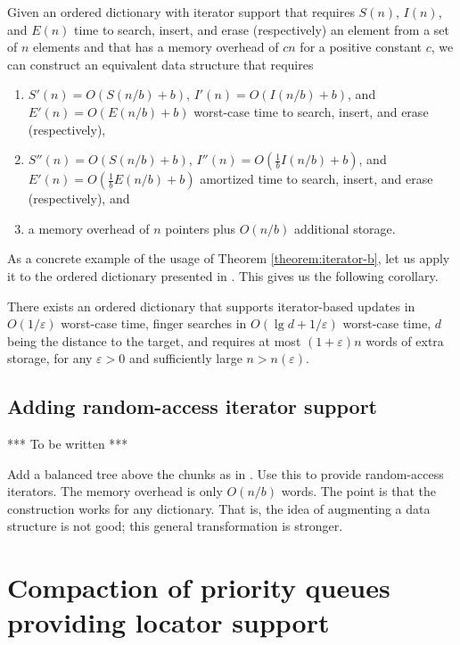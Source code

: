 \documentclass{DIKU-article}
\newcommand{\seclabel}[1]{\label{sec:#1}}
\begin{document}
\begin{theorem}
\label{theorem:iterator-b}
Given an ordered dictionary with iterator support that requires 
$S(n)$, $I(n)$, and $E(n)$
time to search, insert, and erase (respectively) an element from a
set of $n$ elements and that has a memory overhead of $cn$ for a
positive constant $c$, we can construct an equivalent data structure
that requires 
\begin{enumerate}
\item $S'(n)=O(S(n/b)+b)$, $I'(n)=O(I(n/b)+b)$,
and $E'(n)=O(E(n/b)+b)$ worst-case time to search, insert,
and erase (respectively), 
\item $S''(n)=O(S(n/b)+b)$,
$I''(n)=O(\frac{1}{b}I(n/b)+b)$, and
$E'(n)=O(\frac{1}{b}E(n/b)+b)$ amortized time to search,
insert, and erase (respectively), and 
\item a memory overhead of
$n$ pointers plus $O(n/b)$ additional storage.
\end{enumerate}
\end{theorem}

As a concrete example of the usage of Theorem
\ref{theorem:iterator-b}, let us apply it to the ordered dictionary
presented in \cite{BLMTT03}. This gives us the following corollary.

\begin{corollary}
\label{corollary:dictionary}
There exists an ordered dictionary that supports iterator-based
updates in $O(1/\varepsilon)$ worst-case time, finger searches in
$O(\lg d + 1/\varepsilon)$ worst-case time, $d$ being the distance to
the target, and requires at most $(1 + \varepsilon)n$ words of
extra storage, for any $\varepsilon > 0$ and sufficiently large
$n > n(\varepsilon)$.
\end{corollary}

\subsection{Adding random-access iterator support}

*** To be written ***

Add a balanced tree above the chunks as in \cite[Section
14.1]{CLRS01}. Use this to provide random-access iterators. The memory
overhead is only $O(n/b)$ words. The point is that the construction
works for any dictionary. That is, the idea of augmenting a data
structure is not good; this general transformation is stronger.

\section{Compaction of priority queues providing locator support}\seclabel{iterator-queues}
\end{document}
